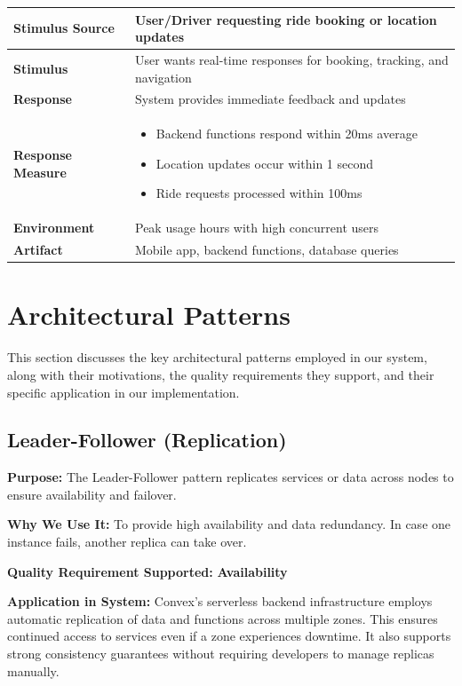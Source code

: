 \documentclass[12pt]{article}
\begin{document}
\begin{itemize}
  \begin{table}[h]
\centering
\begin{tabular}{|l|p{10cm}|}
\hline
\textbf{Stimulus Source} & User/Driver requesting ride booking or location updates \\
\hline
\textbf{Stimulus} & User wants real-time responses for booking, tracking, and navigation \\
\hline
\textbf{Response} & System provides immediate feedback and updates \\
\hline
\textbf{Response Measure} & 
\begin{itemize}
  \item Backend functions respond within 20ms average
  \item Location updates occur within 1 second
  \item Ride requests processed within 100ms
\end{itemize} \\
\hline
\textbf{Environment} & Peak usage hours with high concurrent users \\
\hline
\textbf{Artifact} & Mobile app, backend functions, database queries \\
\hline
\end{tabular}
\end{table}
\end{itemize}

\section{Architectural Patterns}

This section discusses the key architectural patterns employed in our system, along with their motivations, the quality requirements they support, and their specific application in our implementation.

\subsection{Leader-Follower (Replication)}

\textbf{Purpose:} The Leader-Follower pattern replicates services or data across nodes to ensure availability and failover.

\textbf{Why We Use It:} To provide high availability and data redundancy. In case one instance fails, another replica can take over.

\textbf{Quality Requirement Supported:} \textbf{Availability}

\textbf{Application in System:}  
Convex’s serverless backend infrastructure employs automatic replication of data and functions across multiple zones. This ensures continued access to services even if a zone experiences downtime. It also supports strong consistency guarantees without requiring developers to manage replicas manually.
\end{document}
